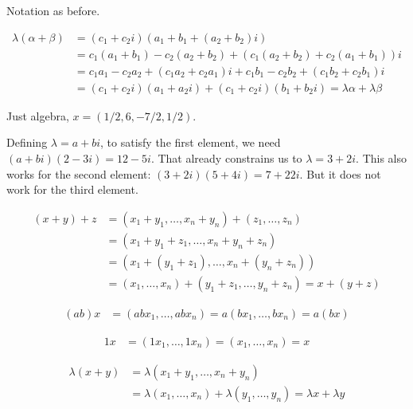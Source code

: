 \documentclass{article}
\begin{document}

Notation as before.

\begin{align*}
\lambda(\alpha + \beta) & = (c_1 + c_2i)(a_1 + b_1 + (a_2 + b_2)i) \\
                        & = c_1(a_1 + b_1) - c_2(a_2 + b_2) + (c_1(a_2 + b_2) + c_2(a_1 + b_1))i \\
                        & = c_1a_1 - c_2a_2 + (c_1a_2 + c_2a_1)i + c_1b_1 - c_2b_2 + (c_1b_2 + c_2b_1)i \\
                        & = (c_1 + c_2i)(a_1 + a_2i) + (c_1 + c_2i)(b_1 + b_2i) = \lambda\alpha + \lambda\beta
\end{align*}


Just algebra, $x = (1/2, 6, -7/2, 1/2)$.


Defining $\lambda = a + bi$, to satisfy the first element, we need $(a+bi)(2-3i)
= 12-5i$. That already constrains us to $\lambda = 3 + 2i$. This also works for
the second element: $(3 + 2i)(5 + 4i) = 7 + 22i$. But it does not work for the
third element.


\begin{align*}
(x + y) + z & = (x_1 + y_1, \ldots, x_n + y_n) + (z_1, \ldots, z_n) \\
            & = (x_1 + y_1 + z_1, \ldots, x_n + y_n + z_n) \\
            & = (x_1 + (y_1 + z_1), \ldots, x_n + (y_n + z_n)) \\
            & = (x_1, \ldots, x_n) + (y_1 + z_1, \ldots, y_n + z_n) = x + (y + z)
\end{align*}


\begin{align*}
(ab)x & = (abx_1, \ldots, abx_n) = a(bx_1, \ldots, bx_n) = a(bx)
\end{align*}


\begin{align*}
1x & = (1x_1, \ldots, 1x_n) = (x_1, \ldots, x_n) = x
\end{align*}


\begin{align*}
\lambda(x+y) & = \lambda(x_1 + y_1, \ldots, x_n + y_n) \\
             & = \lambda(x_1, \ldots, x_n) + \lambda(y_1, \ldots, y_n) = \lambda x + \lambda y
\end{align*}
\end{document}
